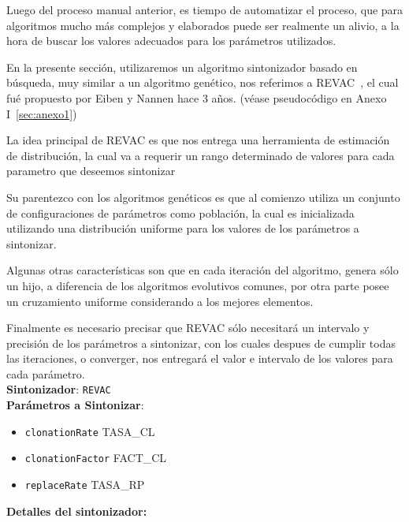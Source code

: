 Luego del proceso manual anterior, es tiempo de automatizar el proceso,
que para algoritmos mucho más complejos y elaborados puede ser realmente un alivio,
a la hora de buscar los valores adecuados para los parámetros utilizados.

En la presente sección, utilizaremos un algoritmo sintonizador basado en búsqueda,
muy similar a un algoritmo genético, nos referimos a REVAC~\cite{REVAC},
el cual fué propuesto por Eiben y Nannen hace 3 años. (véase pseudocódigo en Anexo I~\ref{sec:anexo1})

La idea principal de REVAC es que nos entrega una herramienta de estimación
de distribución, la cual va a requerir un rango determinado de valores para
cada parametro que deseemos sintonizar

Su parentezco con los algoritmos genéticos es que al comienzo utiliza un
conjunto de configuraciones de parámetros como población, la cual es inicializada
utilizando una distribución uniforme para los valores de los parámetros a sintonizar.

Algunas otras características son que en cada iteración del algoritmo, genera sólo
un hijo, a diferencia de los algoritmos evolutivos comunes, por otra parte posee
un cruzamiento uniforme considerando a los mejores elementos.

Finalmente es necesario precisar que REVAC sólo necesitará un intervalo y precisión
de los parámetros a sintonizar, con los cuales despues de cumplir todas las iteraciones,
o converger, nos entregará el valor e intervalo de los valores para cada parámetro.\\ 

\textbf{Sintonizador}: \texttt{REVAC}\\

\textbf{Parámetros a Sintonizar}:\\

\begin{itemize}
	\item \texttt{clonationRate} TASA\_CL \blue{[0,1]}
	\item \texttt{clonationFactor} FACT\_CL \blue{[0,1]}
	\item \texttt{replaceRate} TASA\_RP \blue{[0,1]}
\end{itemize}

\textbf{Detalles del sintonizador:}\\

